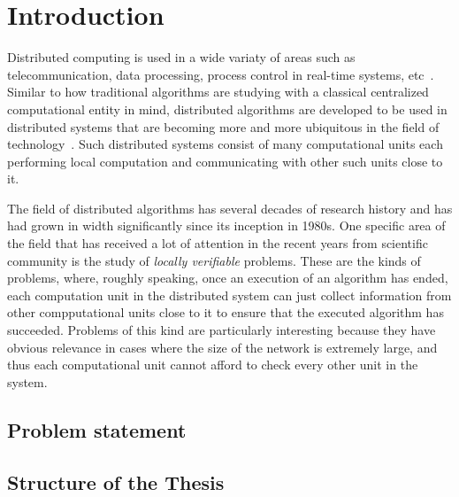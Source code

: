 \chapter{Introduction}
\label{chapter:intro}

Distributed computing is used in a wide variaty of areas
such as telecommunication, data processing, process control in real-time systems, etc~\cite{Lynch1996}. Similar to
how traditional algorithms are studying with a classical
centralized computational entity in mind, distributed
algorithms are developed to be used in distributed
systems that are becoming more and more ubiquitous in the
field of technology~\cite{Attiya2004}. Such distributed
systems consist of many computational units each
performing local computation and communicating
with other such units close to it.

The field of distributed algorithms has several
decades of research history and has had grown
in width significantly since its inception in 1980s.
One specific
area of the field that has received a lot of
attention in the recent years from scientific
community is the study of \emph{locally verifiable}
problems.
These are the kinds of problems, where, roughly speaking,
once an execution of an algorithm has ended, each
computation unit in the distributed system can just
collect information from other compputational units
close to it to ensure that the executed algorithm has succeeded. Problems of this kind are particularly
interesting because they have obvious relevance
in cases where the size of the network is extremely
large, and thus each computational unit
cannot afford to check every other unit in the system.

\section{Problem statement}



\section{Structure of the Thesis}
\label{section:structure} 
